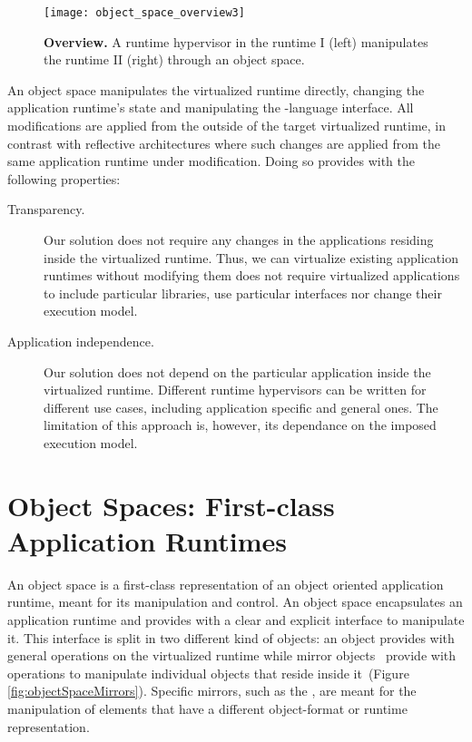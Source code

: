 \begin{figure}[htb]
\begin{center}
\texttt{[image: object\_space\_overview3]}
\caption{\textbf{\VTT Overview.} A runtime hypervisor in the runtime I (left) manipulates the runtime II (right) through an object space.\label{fig:objectSpaceOverview_architecture}}
\end{center}
\end{figure}

An object space manipulates the virtualized runtime directly, changing the application runtime's state and manipulating the \VM-language interface. All modifications are applied from the outside of the target virtualized runtime, in contrast with reflective architectures where such changes are applied from the same application runtime under modification. Doing so provides \Vtt with the following properties:

\begin{description}
\item[Transparency.] Our solution does not require any changes in the applications residing inside the virtualized runtime. Thus, we can virtualize existing application runtimes without modifying them \ie \Vtt does not require virtualized applications to include particular libraries, use particular interfaces nor change their execution model.

\item[Application independence.] Our solution does not depend on the particular application inside the virtualized runtime. Different runtime hypervisors can be written for different use cases, including application specific and general ones. The limitation of this approach is, however, its dependance on the \VM imposed execution model.
\end{description}

\section{Object Spaces: First-class Application Runtimes} \label{sec:object_space}

An object space is a first-class representation of an object oriented application runtime, meant for its manipulation and control. An object space encapsulates an application runtime and provides with a clear and explicit interface to manipulate it. This interface is split in two different kind of objects: an  object provides with general operations on the virtualized runtime while mirror objects~\cite{Brac04b} provide with operations to manipulate individual objects that reside inside it~(Figure \ref{fig:objectSpaceMirrors}). Specific mirrors, such as the , are meant for the manipulation of elements that have a different object-format or runtime representation.

